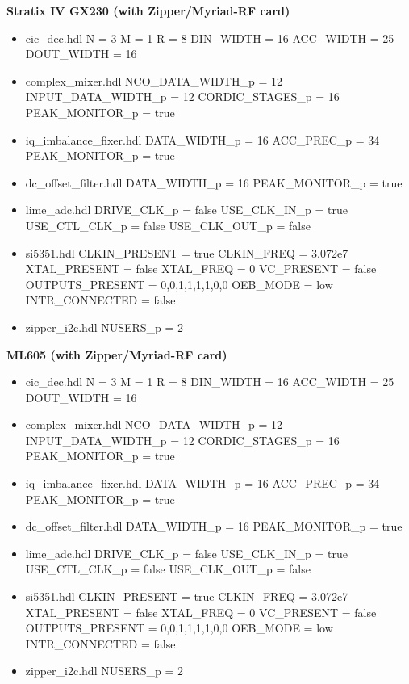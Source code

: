\documentclass{article}
\begin{document}
\begin{minipage}[t]{.5\textwidth}
	\textbf{Stratix IV GX230 (with Zipper/Myriad-RF card)}
	\begin{itemize}
		\item cic\_dec.hdl
			\subitem N = 3
			\subitem M = 1
			\subitem R = 8
			\subitem DIN\_WIDTH = 16
			\subitem ACC\_WIDTH = 25
			\subitem DOUT\_WIDTH = 16
		\item complex\_mixer.hdl
			\subitem NCO\_DATA\_WIDTH\_p = 12
			\subitem INPUT\_DATA\_WIDTH\_p = 12
			\subitem CORDIC\_STAGES\_p = 16
			\subitem PEAK\_MONITOR\_p = true
		\item iq\_imbalance\_fixer.hdl
			\subitem DATA\_WIDTH\_p = 16
			\subitem ACC\_PREC\_p = 34
			\subitem PEAK\_MONITOR\_p = true
		\item dc\_offset\_filter.hdl
			\subitem DATA\_WIDTH\_p = 16
			\subitem PEAK\_MONITOR\_p = true
		\item lime\_adc.hdl
			\subitem DRIVE\_CLK\_p = false
			\subitem USE\_CLK\_IN\_p = true
			\subitem USE\_CTL\_CLK\_p = false
			\subitem USE\_CLK\_OUT\_p = false
		\item si5351.hdl
			\subitem CLKIN\_PRESENT = true
			\subitem CLKIN\_FREQ = 3.072e7
			\subitem XTAL\_PRESENT = false
			\subitem XTAL\_FREQ = 0
			\subitem VC\_PRESENT = false
			\subitem OUTPUTS\_PRESENT = 0,0,1,1,1,1,0,0
			\subitem OEB\_MODE = low
			\subitem INTR\_CONNECTED = false
		\item zipper\_i2c.hdl
			\subitem NUSERS\_p = 2
	\end{itemize}
\end{minipage}
\begin{minipage}[t]{.5\textwidth}
	\textbf{ML605 (with Zipper/Myriad-RF card)}
	\begin{itemize}
		\item cic\_dec.hdl
			\subitem N = 3
			\subitem M = 1
			\subitem R = 8
			\subitem DIN\_WIDTH = 16
			\subitem ACC\_WIDTH = 25
			\subitem DOUT\_WIDTH = 16
		\item complex\_mixer.hdl
			\subitem NCO\_DATA\_WIDTH\_p = 12
			\subitem INPUT\_DATA\_WIDTH\_p = 12
			\subitem CORDIC\_STAGES\_p = 16
			\subitem PEAK\_MONITOR\_p = true
		\item iq\_imbalance\_fixer.hdl
			\subitem DATA\_WIDTH\_p = 16
			\subitem ACC\_PREC\_p = 34
			\subitem PEAK\_MONITOR\_p = true
		\item dc\_offset\_filter.hdl
			\subitem DATA\_WIDTH\_p = 16
			\subitem PEAK\_MONITOR\_p = true
		\item lime\_adc.hdl
			\subitem DRIVE\_CLK\_p = false
			\subitem USE\_CLK\_IN\_p = true
			\subitem USE\_CTL\_CLK\_p = false
			\subitem USE\_CLK\_OUT\_p = false
		\item si5351.hdl
			\subitem CLKIN\_PRESENT = true
			\subitem CLKIN\_FREQ = 3.072e7
			\subitem XTAL\_PRESENT = false
			\subitem XTAL\_FREQ = 0
			\subitem VC\_PRESENT = false
			\subitem OUTPUTS\_PRESENT = 0,0,1,1,1,1,0,0
			\subitem OEB\_MODE = low
			\subitem INTR\_CONNECTED = false
		\item zipper\_i2c.hdl
			\subitem NUSERS\_p = 2
	\end{itemize}
\end{minipage}\newpage
\end{document}
